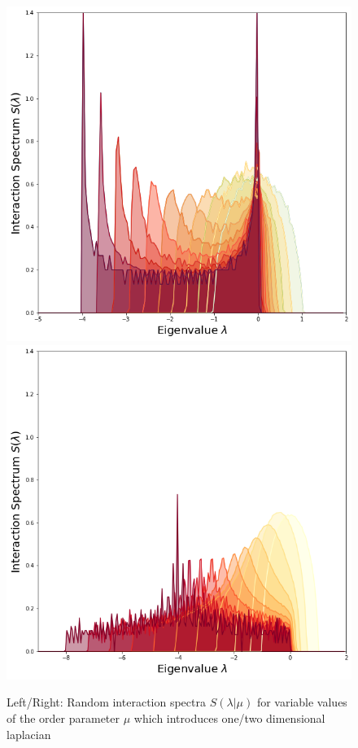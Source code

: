\documentclass{article}[12pt]
\numberwithin{equation}{section}
\begin{document}
\begin{figure}[H]
\centering{}
\captionsetup{justification=centering}
\includegraphics[scale=0.3]{figures/interaction1d}
\includegraphics[scale=0.3]{figures/interaction2d}
\caption{Left/Right: Random interaction spectra $S(\lambda|\mu)$ for variable
values of the order parameter $\mu$ which introduces one/two dimensional laplacian}
\label{fig:spectrum}
\end{figure}
\end{document}
